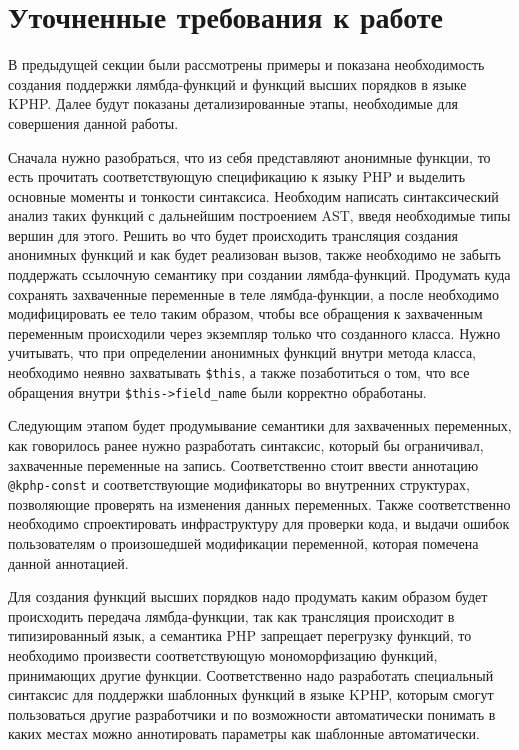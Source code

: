 \section{Уточненные требования к работе}
В предыдущей секции были рассмотрены примеры и показана необходимость создания поддержки лямбда-функций и функций высших порядков в языке KPHP. Далее будут показаны детализированные этапы, необходимые для совершения данной работы.

Сначала нужно разобраться, что из себя представляют анонимные функции, то есть прочитать соответствующую спецификацию к языку PHP и выделить основные моменты и тонкости синтаксиса.
Необходим написать синтаксический анализ таких функций с дальнейшим построением AST, введя необходимые типы вершин для этого.
Решить во что будет происходить трансляция создания анонимных функций и как будет реализован вызов, также необходимо не забыть поддержать ссылочную семантику при создании лямбда-функций.
Продумать куда сохранять захваченные переменные в теле лямбда-функции, а после необходимо модифицировать ее тело таким образом, чтобы все обращения к захваченным переменным происходили через экземпляр только что созданного класса.
Нужно учитывать, что при определении анонимных функций внутри метода класса, необходимо неявно захватывать \verb|$this|, а также позаботиться о том, что все обращения внутри \verb|$this->field_name| были корректно обработаны.

Следующим этапом будет продумывание семантики для захваченных переменных, как говорилось ранее нужно разработать синтаксис, который бы ограничивал, захваченные переменные на запись.
Соответственно стоит ввести аннотацию \verb|@kphp-const| и соответствующие модификаторы во внутренних структурах, позволяющие проверять на изменения данных переменных.
Также соответственно необходимо спроектировать инфраструктуру для проверки кода, и выдачи ошибок пользователям о произошедшей модификации переменной, которая помечена данной аннотацией.

Для создания функций высших порядков надо продумать каким образом будет происходить передача лямбда-функции, так как трансляция происходит в типизированный язык, а семантика PHP запрещает перегрузку функций, то необходимо произвести соответствующую мономорфизацию функций, принимающих другие функции.
Соответственно надо разработать специальный синтаксис для поддержки шаблонных функций в языке KPHP, которым смогут пользоваться другие разработчики и по возможности автоматически понимать в каких местах можно аннотировать параметры как шаблонные автоматически.

